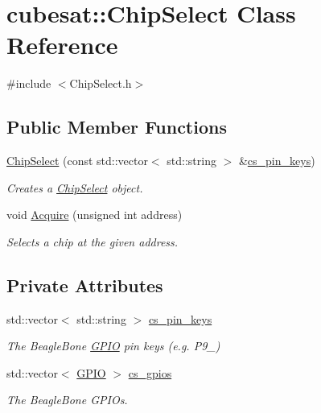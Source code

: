 \hypertarget{classcubesat_1_1ChipSelect}{}\section{cubesat\+:\+:Chip\+Select Class Reference}
\label{classcubesat_1_1ChipSelect}


{\ttfamily \#include $<$Chip\+Select.\+h$>$}

\subsection*{Public Member Functions}
\begin{DoxyCompactItemize}
\item 
\hyperlink{classcubesat_1_1ChipSelect_a18fb93813dc66313c0ebdea468f61366}{Chip\+Select} (const std\+::vector$<$ std\+::string $>$ \&\hyperlink{classcubesat_1_1ChipSelect_ae6285a5edb25a1dbecce248bf1ac241d}{cs\+\_\+pin\+\_\+keys})
\begin{DoxyCompactList}\small\item\em Creates a \hyperlink{classcubesat_1_1ChipSelect}{Chip\+Select} object. \end{DoxyCompactList}\item 
void \hyperlink{classcubesat_1_1ChipSelect_ab173c06bea583f833b11bae2a305701d}{Acquire} (unsigned int address)
\begin{DoxyCompactList}\small\item\em Selects a chip at the given address. \end{DoxyCompactList}\end{DoxyCompactItemize}
\subsection*{Private Attributes}
\begin{DoxyCompactItemize}
\item 
std\+::vector$<$ std\+::string $>$ \hyperlink{classcubesat_1_1ChipSelect_ae6285a5edb25a1dbecce248bf1ac241d}{cs\+\_\+pin\+\_\+keys}
\begin{DoxyCompactList}\small\item\em The Beagle\+Bone \hyperlink{classcubesat_1_1GPIO}{G\+P\+IO} pin keys (e.\+g. P9\+\_) \end{DoxyCompactList}\item 
std\+::vector$<$ \hyperlink{classcubesat_1_1GPIO}{G\+P\+IO} $>$ \hyperlink{classcubesat_1_1ChipSelect_a549f890313f33099ac514679d86501a4}{cs\+\_\+gpios}
\begin{DoxyCompactList}\small\item\em The Beagle\+Bone G\+P\+I\+Os. \end{DoxyCompactList}\end{DoxyCompactItemize}


